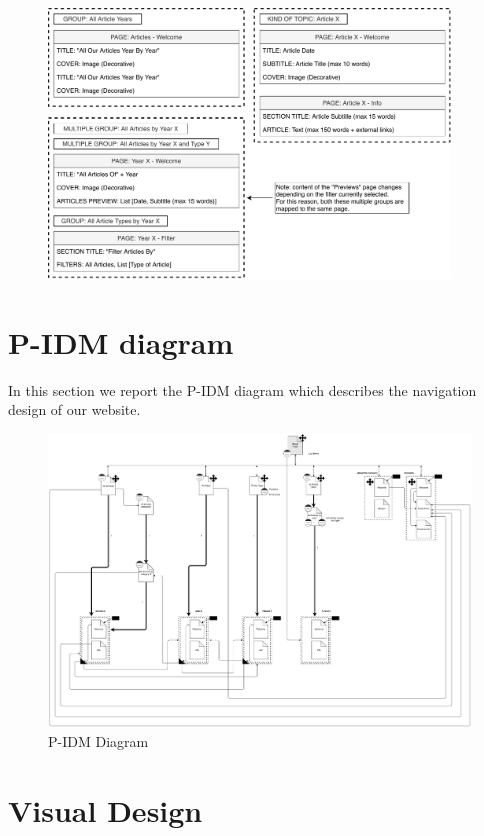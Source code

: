\documentclass[12pt]{report}
\begin{document}
\begin{figure}[H]
	\centering
	\includegraphics[width=0.95\textwidth]{page_mapping_pt3.pdf}
\end{figure}

\chapter{P-IDM diagram}
In this section we report the P-IDM diagram which describes the navigation design of our website.\\
\begin{figure}[h]
	\centering
	\includegraphics[width=\textwidth]{P-IDM.pdf}
	\caption{P-IDM Diagram}
\end{figure}

\chapter{Visual Design}
\end{document}
